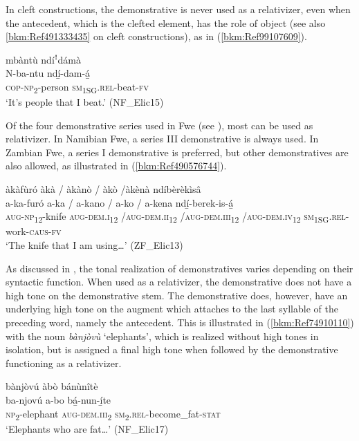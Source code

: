 In cleft constructions, the demonstrative is never used as a relativizer, even when the antecedent, which is the clefted element, has the role of object (see also \ref{bkm:Ref491333435} on cleft constructions), as in (\ref{bkm:Ref99107609}).

\ea
\label{bkm:Ref99107609}
mbàntù ndíꜝdámà\\
\gll N-ba-ntu    ndí̲-dam-á̲\\
\textsc{cop}-\textsc{np}\textsubscript{2}-person  \textsc{sm}\textsubscript{1SG}.\textsc{rel}-beat-\textsc{fv}\\
\glt ‘It’s people that I beat.’ (NF\_Elic15)
\z

Of the four demonstrative series used in Fwe (see ), most can be used as relativizer. In Namibian Fwe, a series III demonstrative is always used. In Zambian Fwe, a series I demonstrative is preferred, but other demonstratives are also allowed, as illustrated in (\ref{bkm:Ref490576744}).

\ea
\label{bkm:Ref490576744}
àkàfùró àkà / àkànò / àkò /àkènà ndíbèrèkìsâ\\
\gll a-ka-furó    {a-ka /} {a-kano /} {a-ko /} a-kena  ndí̲-berek-is-á̲ \\
\textsc{aug}-\textsc{np}\textsubscript{12}-knife  \textsc{aug}-\textsc{dem}.\textsc{i}\textsubscript{12} /\textsc{aug}-\textsc{dem}.\textsc{ii}\textsubscript{12} /\textsc{aug}-\textsc{dem}.\textsc{iii}\textsubscript{12} /\textsc{aug}-\textsc{dem}.\textsc{iv}\textsubscript{12}
\textsc{sm}\textsubscript{1SG}.\textsc{rel}-work-\textsc{caus}-\textsc{fv}\\
\glt ‘The knife that I am using…’ (ZF\_Elic13)
\z

As discussed in , the tonal realization of demonstratives varies depending on their syntactic function. When used as a relativizer, the demonstrative does not have a high tone on the demonstrative stem. The demonstrative does, however, have an underlying high tone on the augment which attaches to the last syllable of the preceding word, namely the antecedent. This is illustrated in (\ref{bkm:Ref74910110}) with the noun \textit{bànjòvù} ‘elephants’, which is realized without high tones in isolation, but is assigned a final high tone when followed by the demonstrative functioning as a relativizer.

\ea
\label{bkm:Ref74910110}
bànjòvú àbò bánùnîtè\\
\gll ba-njovú  a-bo    bá̲-nun-í̲te\\
\textsc{np}\textsubscript{2}-elephant  \textsc{aug}-\textsc{dem}.\textsc{iii}\textsubscript{2}  \textsc{sm}\textsubscript{2}.\textsc{rel}-become\_fat-\textsc{stat}\\
\glt ‘Elephants who are fat…’ (NF\_Elic17)
\z

